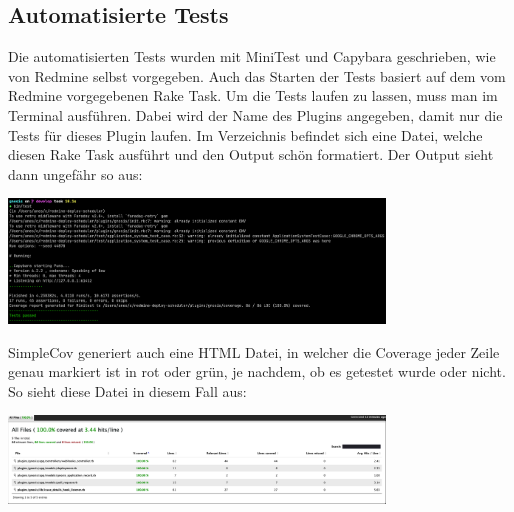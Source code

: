 \subsection{Automatisierte Tests}
\label{sec:automated-tests}
Die automatisierten Tests wurden mit MiniTest und Capybara geschrieben, wie von Redmine selbst
vorgegeben. Auch das Starten der Tests basiert auf dem vom Redmine vorgegebenen Rake Task. Um die
Tests laufen zu lassen, muss man  im Terminal
ausführen. Dabei wird der Name des Plugins angegeben, damit nur die Tests für dieses Plugin laufen. Im
 Verzeichnis befindet sich eine  Datei, welche
diesen Rake Task ausführt und den Output schön formatiert.
Der Output sieht dann ungefähr so aus:
\begin{center}
    \includegraphics[width=0.75\textwidth]{images/misc/simplecov_terminal_output.png}
    \label{fig:simplecov_terminal_output}
\end{center}
SimpleCov generiert auch eine HTML Datei, in welcher die Coverage jeder Zeile genau markiert ist in
rot oder grün, je nachdem, ob es getestet wurde oder nicht. So sieht diese Datei in diesem Fall aus:
\begin{center}
    \includegraphics[width=0.75\textwidth]{images/misc/simplecov_html.png}
    \label{fig:simplecov_html_output}
\end{center}

